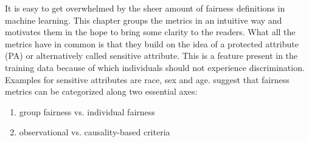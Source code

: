 It is easy to get overwhelmed by the sheer amount of fairness definitions in machine learning. This chapter groups the metrics in an intuitive way and motivates them in the hope to bring some clarity to the readers. What all the metrics have in common is that they build on the idea of a protected attribute (PA) or alternatively called sensitive attribute. This is a feature present in the training data because of which individuals should not experience discrimination. Examples for sensitive attributes are race, sex and age.
\cite{castelnovo2022} suggest that fairness metrics can be categorized along two essential axes:
\begin{enumerate}
    \item group fairness vs. individual fairness
    \item observational vs. causality-based criteria
\end{enumerate}

